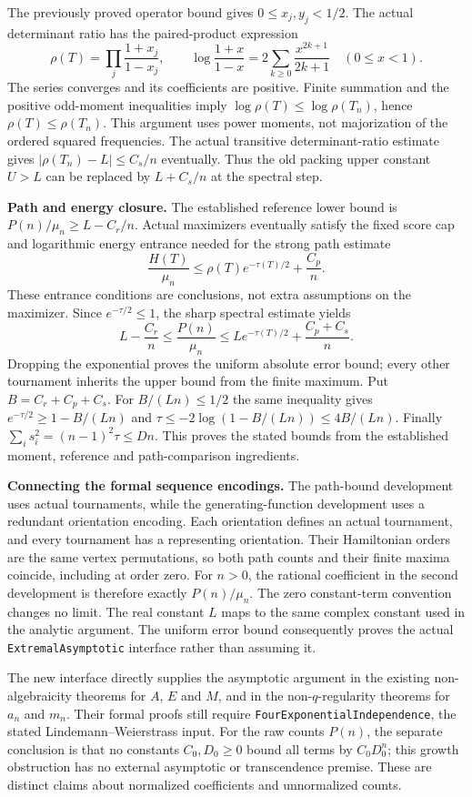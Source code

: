 \documentclass[11pt]{article}
\begin{document}
The previously proved operator bound gives $0\le x_j,y_j<1/2$.
The actual determinant ratio has the paired-product expression
\[
 \rho(T)=\prod_j\frac{1+x_j}{1-x_j},\qquad
 \log\frac{1+x}{1-x}=2\sum_{k\ge0}\frac{x^{2k+1}}{2k+1}\quad(0\le x<1).
\]
The series converges and its coefficients are positive. Finite summation
and the positive odd-moment inequalities imply
$\log\rho(T)\le\log\rho(T_n)$, hence $\rho(T)\le\rho(T_n)$.
This argument uses power moments, not majorization of the ordered squared
frequencies. The actual transitive determinant-ratio estimate gives
$|\rho(T_n)-L|\le C_s/n$ eventually. Thus the old packing upper constant
$U>L$ can be replaced by $L+C_s/n$ at the spectral step.

\textbf{Path and energy closure.} The established reference lower bound is
$P(n)/\mu_n\ge L-C_r/n$. Actual maximizers eventually satisfy the fixed
score cap and logarithmic energy entrance needed for the strong path estimate
\[
 \frac{H(T)}{\mu_n}\le\rho(T)e^{-\tau(T)/2}+\frac{C_p}{n}.
\]
These entrance conditions are conclusions, not extra assumptions on the
maximizer. Since $e^{-\tau/2}\le1$, the sharp spectral estimate yields
\[
 L-\frac{C_r}{n}\le\frac{P(n)}{\mu_n}
 \le L e^{-\tau(T)/2}+\frac{C_p+C_s}{n}.
\]
Dropping the exponential proves the uniform absolute error bound; every
other tournament inherits the upper bound from the finite maximum.
Put $B=C_r+C_p+C_s$. For $B/(Ln)\le1/2$ the same inequality gives
$e^{-\tau/2}\ge1-B/(Ln)$ and
$\tau\le-2\log(1-B/(Ln))\le4B/(Ln)$.
Finally $\sum_i s_i^2=(n-1)^2\tau\le Dn$. This proves the stated bounds
from the established moment, reference and path-comparison ingredients.

\textbf{Connecting the formal sequence encodings.} The path-bound development
uses actual tournaments, while the generating-function development uses a
redundant orientation encoding. Each orientation defines an actual tournament,
and every tournament has a representing orientation. Their Hamiltonian orders
are the same vertex permutations, so both path counts and their finite maxima
coincide, including at order zero. For $n>0$, the rational coefficient in the
second development is therefore exactly $P(n)/\mu_n$. The zero constant-term
convention changes no limit. The real constant $L$ maps to the same complex
constant used in the analytic argument. The uniform error bound consequently
proves the actual \texttt{ExtremalAsymptotic} interface rather than assuming it.

The new interface directly supplies the asymptotic argument in the existing
non-algebraicity theorems for $A$, $E$ and $M$, and in the non-$q$-regularity
theorems for $a_n$ and $m_n$. Their formal proofs still require
\texttt{FourExponentialIndependence}, the stated Lindemann--Weierstrass input.
For the raw counts $P(n)$, the separate conclusion is that no constants
$C_0,D_0\ge0$ bound all terms by $C_0D_0^n$; this growth obstruction has
no external asymptotic or transcendence premise. These are distinct claims
about normalized coefficients and unnormalized counts.
\end{document}

